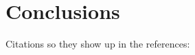 \section{Conclusions}
Citations so they show up in the references:
\cite{Herman2000}
\cite{VonLandesberger2011}
\cite{Goyal2018}
\cite{Lhuillier2017}
\cite{Vehlow2015}
\cite{Gibson2013} \\



%








